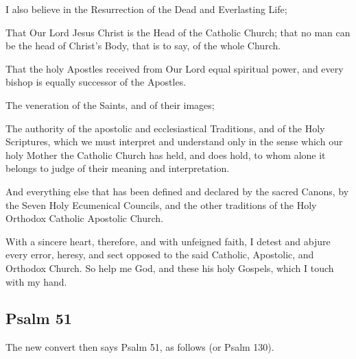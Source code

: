 I also believe in 
the Resurrection of the Dead and Everlasting Life;

That Our Lord Jesus Christ is the Head of the Catholic Church; that no man can be the head of Christ's Body, that is to say, of the whole Church.

That the holy Apostles received from Our Lord equal spiritual power, and every bishop is equally successor of the Apostles.

The veneration of the Saints, and of their images;

The authority of the apostolic and ecclesiastical Traditions, and of the Holy Scriptures, which we must interpret and understand only in the sense which our holy Mother the Catholic Church has held, and does hold, to whom alone it belongs to judge of their meaning and interpretation.

And everything else that has been defined and declared by the sacred Canons, by the 
Seven Holy Ecumenical Councils, and the other traditions of the Holy Orthodox Catholic Apostolic Church.%

With a sincere heart, therefore, and with unfeigned faith, I detest and abjure every error, heresy, and sect opposed to the said Catholic, Apostolic, and 
Orthodox Church. So help me God, and these his holy Gospels, which I touch with my hand.

\subsection{Psalm 51}

\begin{rubric}
    The new convert then says Psalm 51, as follows (or Psalm 130).
\end{rubric}

